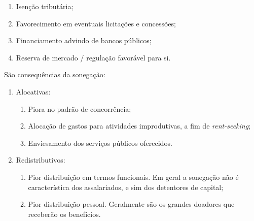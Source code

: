 \documentclass[12pt,a4paper,oneside,brazil]{abntex2}
\begin{document}
\begin{enumerate}
	\item Isenção tributária;
	\item Favorecimento em eventuais licitações e concessões;
	\item Financiamento advindo de bancos públicos;
	\item Reserva de mercado / regulação favorável para si.
\end{enumerate}

São consequências da sonegação:
\begin{enumerate}
	\item Alocativas:
	\begin{enumerate}
		\item Piora no padrão de concorrência;
		\item Alocação de gastos para atividades improdutivas, a fim de \emph{rent-seeking};
		\item Enviesamento dos serviços públicos oferecidos.
	\end{enumerate}
	\item Redistributivos:
	\begin{enumerate}
		\item Pior distribuição em termos funcionais. Em geral a sonegação não é característica dos assalariados, e sim dos detentores de capital;
		\item Pior distribuição pessoal. Geralmente são os grandes doadores que receberão os benefícios.
	\end{enumerate}
\end{enumerate}


\printbibliography
\end{document}
